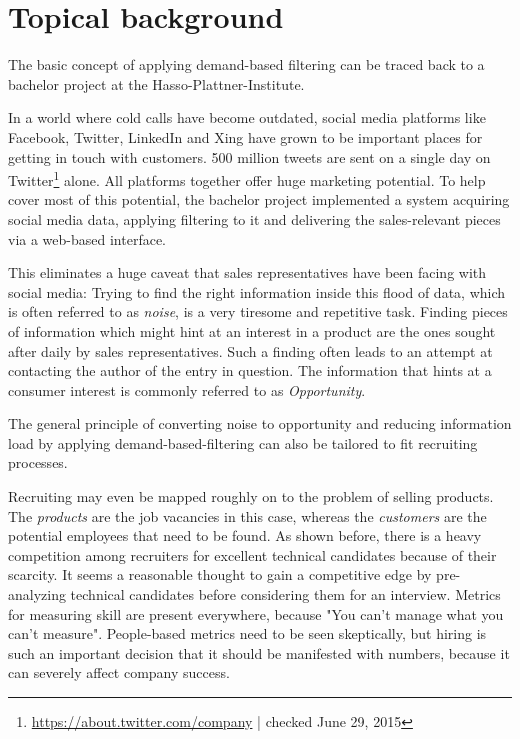 \section{Topical background}
The basic concept of applying demand-based filtering can be traced back to a bachelor project at the Hasso-Plattner-Institute.


In a world where cold calls have become outdated\cite{bh:2014}, social media platforms like Facebook, Twitter, LinkedIn and Xing have grown to be important places for getting in touch with customers. 500 million tweets are sent on a single day on Twitter\footnote{\url{https://about.twitter.com/company} | checked June 29, 2015} alone. All platforms together offer huge marketing potential. To help cover most of this potential, the bachelor project implemented a system acquiring social media data, applying filtering to it and delivering the sales-relevant pieces via a web-based interface.

This eliminates a huge caveat that sales representatives have been facing with social media: Trying to find the right information inside this flood of data, which is often referred to as \textit{noise}, is a very tiresome and repetitive task. Finding pieces of information which might hint at an interest in a product are the ones sought after daily by sales representatives. Such a finding often leads to an attempt at contacting the author of the entry in question. The information that hints at a consumer interest is commonly referred to as \textit{Opportunity}.
\newline


The general principle of converting noise to opportunity and reducing information load by applying demand-based-filtering can also be tailored to fit recruiting processes.


Recruiting may even be mapped roughly on to the problem of selling  products. The \textit{products} are the job vacancies in this case, whereas the \textit{customers} are the potential employees that need to be found. As shown before, there is a heavy competition among recruiters for excellent technical candidates because of their scarcity. It seems a reasonable thought to gain a competitive edge by pre-analyzing technical candidates before considering them for an interview. Metrics for measuring skill are present everywhere, because
"You can't manage what you can't measure"\cite{tdm:1986}.  People-based metrics need to be seen skeptically, but hiring is such an important decision that it should be manifested with numbers, because it can severely affect company success\cite{hk:1998}.